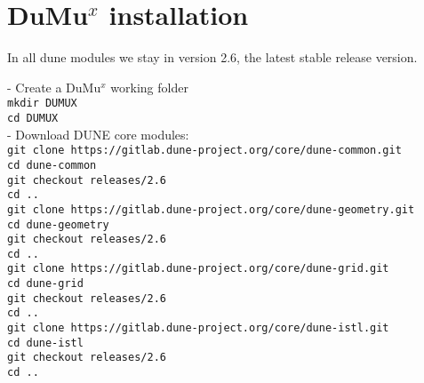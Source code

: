 \section*{DuMu$^x$ installation}
In all dune modules we stay in version 2.6, the latest stable release version. 

- Create a DuMu$^x$ working folder\\
\lstinline{mkdir DUMUX}\\
\lstinline{cd DUMUX}\\
- Download DUNE core modules:\\
\texttt{git clone https://gitlab.dune-project.org/core/dune-common.git}\\
    \hspace{\parindent} \texttt{cd dune-common}\\
    \hspace{\parindent} \texttt{git checkout releases/2.6}\\
		\hspace{\parindent} \texttt{cd ..}\\
\texttt{git clone https://gitlab.dune-project.org/core/dune-geometry.git}\\
    \hspace{\parindent} \texttt{cd dune-geometry}\\
    \hspace{\parindent} \texttt{git checkout releases/2.6}\\
		\hspace{\parindent} \texttt{cd ..}\\
\texttt{git clone https://gitlab.dune-project.org/core/dune-grid.git}\\
    \hspace{\parindent} \texttt{cd dune-grid}\\
    \hspace{\parindent} \texttt{git checkout releases/2.6}\\
		\hspace{\parindent} \texttt{cd ..}\\
\texttt{git clone https://gitlab.dune-project.org/core/dune-istl.git}\\
    \hspace{\parindent} \texttt{cd dune-istl}\\
    \hspace{\parindent} \texttt{git checkout releases/2.6}\\ 
		\hspace{\parindent} \texttt{cd ..}\\
